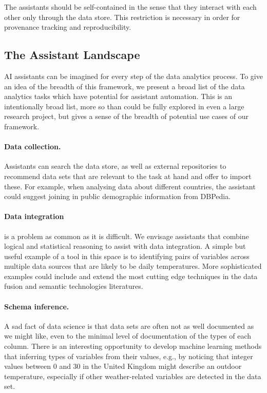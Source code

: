 \documentclass[sigplan,preprint,10pt]{acmart}\settopmatter{printfolios=true,printccs=false,printacmref=false}
\theoremstyle{plain}
\theoremstyle{definition}
\begin{document}
The assistants should be self-contained in the sense that they interact with each other
only through the 
data store. This restriction is necessary in order
for provenance tracking and reproducibility.



\subsection{The Assistant Landscape}
{

AI assistants can be imagined for every step of the data analytics process. 
To give an idea of the breadth of this framework,
we present a broad list of the data analytics tasks which have potential for assistant automation.
This is an intentionally broad list, more so than
could be fully explored in even a large research project, but gives a sense of the breadth of 
potential use cases of our framework.

\paragraph{Data collection.} Assistants can search the data store, as well as external repositories
to recommend data sets that are relevant to the task at hand and offer to import these. For example,
when analysing data about different countries, 
the assistant could suggest joining in public
demographic information from DBPedia.

\paragraph{Data integration} is a problem as common
as it is difficult. We envisage assistants
that combine logical and statistical reasoning to assist
with data  integration. A simple but useful
example of a tool in this space is to
 identifying pairs of variables across multiple data 
sources that are likely to be daily temperatures.
More sophisticated examples could include and extend the
most cutting edge techniques in the data fusion and
semantic technologies literatures.

\paragraph{Schema inference.} A sad fact of data
science is that data sets are often not as well documented
as we might like, even to the minimal level of
documentation of the types of each column.
There is an interesting opportunity to
develop machine learning methods that inferring types of variables from their values, e.g.,
by noticing that integer values between 0 and 30 in 
the United Kingdom might describe an outdoor temperature, especially if other weather-related
variables are detected in the data set.

}
\end{document}
